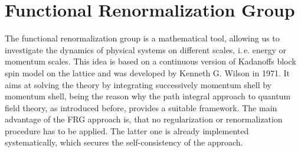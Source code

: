 \section{Functional Renormalization Group}
The functional renormalization group is a mathematical tool, allowing us to investigate the dynamics of physical systems on different scales, i.\,e. energy or momentum scales. This idea is based on a continuous version of Kadanoffs block spin model on the lattice and was developed by Kenneth G. Wilson in 1971. It aims at solving the theory by integrating successively momentum shell by momentum shell, being the reason why the path integral approach to quantum field theory, as introduced before, provides a suitable framework. The main advantage of the FRG approach is, that no regularization or renormalization procedure has to be applied. The latter one is already implemented systematically, which secures the self-consistency of the approach.

